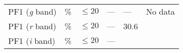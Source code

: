 \begin{longtable}[]{@{}llllll@{}}
\begin{minipage}[t]{0.14\columnwidth}
PF1 (\emph{g} band)\strut
\end{minipage} & \begin{minipage}[t]{0.06\columnwidth}\raggedright\strut
\%\strut
\end{minipage} & \begin{minipage}[t]{0.17\columnwidth}\raggedright\strut
\(\leq 20\)\strut
\end{minipage} & \begin{minipage}[t]{0.17\columnwidth}\raggedright\strut
---\strut
\end{minipage} & \begin{minipage}[t]{0.12\columnwidth}\raggedright\strut
---\strut
\end{minipage} & \begin{minipage}[t]{0.17\columnwidth}\raggedright\strut
No data\strut
\end{minipage}\tabularnewline
\begin{minipage}[t]{0.14\columnwidth}\raggedright\strut
PF1 (\emph{r} band)\strut
\end{minipage} & \begin{minipage}[t]{0.06\columnwidth}\raggedright\strut
\%\strut
\end{minipage} & \begin{minipage}[t]{0.17\columnwidth}\raggedright\strut
\(\leq 20\)\strut
\end{minipage} & \begin{minipage}[t]{0.17\columnwidth}\raggedright\strut
---\strut
\end{minipage} & \begin{minipage}[t]{0.12\columnwidth}\raggedright\strut
30.6\strut
\end{minipage} & \begin{minipage}[t]{0.17\columnwidth}\raggedright\strut
\strut
\end{minipage}\tabularnewline
\begin{minipage}[t]{0.14\columnwidth}\raggedright\strut
PF1 (\emph{i} band)\strut
\end{minipage} & \begin{minipage}[t]{0.06\columnwidth}\raggedright\strut
\%\strut
\end{minipage} & \begin{minipage}[t]{0.17\columnwidth}\raggedright\strut
\(\leq 20\)\strut
\end{minipage} & \begin{minipage}[t]{0.17\columnwidth}\raggedright\strut
---\strut
\end{minipage} & \begin{minipage}[t]{0.12\columnwidth}\raggedright\strut

\end{minipage}
\end{longtable}
